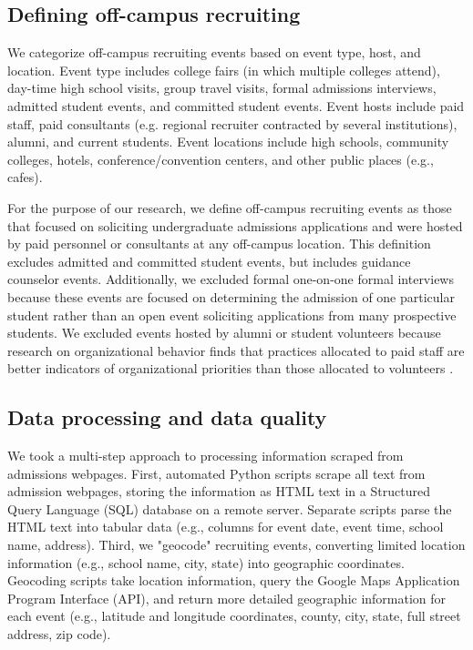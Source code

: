 \documentclass[twoside]{article}
\begin{document}
\subsection*{Defining off-campus recruiting}

We categorize off-campus recruiting events based on event type, host, and location. Event type includes college fairs (in which multiple colleges attend), day-time high school visits, group travel visits, formal admissions interviews, admitted student events, and committed student events. Event hosts include paid staff, paid consultants (e.g. regional recruiter contracted by several institutions), alumni, and current students. Event locations include high schools, community colleges, hotels, conference/convention centers, and other public places (e.g., cafes).  

For the purpose of our research, we define off-campus recruiting events as those that focused on soliciting undergraduate admissions applications and were hosted by paid personnel or consultants at any off-campus location. This definition excludes admitted and committed student events, but includes guidance counselor events. Additionally, we excluded formal one-on-one formal interviews because these events are focused on determining the admission of one particular student rather than an open event soliciting applications from many prospective students. We excluded events hosted by alumni or student volunteers because research on organizational behavior finds that practices allocated to paid staff are better indicators of organizational priorities than those allocated to volunteers \citep{RN531}. 

\subsection*{Data processing and data quality}

We took a multi-step approach to processing information scraped from admissions webpages. First, automated Python scripts scrape all text from admission webpages, storing the information as HTML text in a Structured Query Language (SQL) database on a remote server. Separate scripts parse the HTML text into tabular data (e.g., columns for event date, event time, school name, address). Third, we "geocode" recruiting events, converting limited location information (e.g., school name, city, state) into geographic coordinates. Geocoding scripts take location information, query the Google Maps Application Program Interface (API), and return more detailed geographic information for each event (e.g., latitude and longitude coordinates, county, city, state, full street address, zip code).
\end{document}

